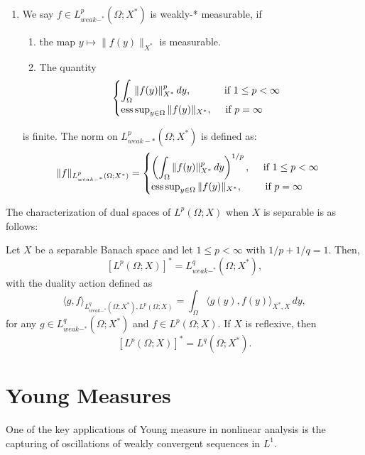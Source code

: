 \begin{defn}
\begin{enumerate}
\begin{enumerate}
        \end{enumerate}
        \item We say $f\in L^p_{weak-^*}(\Omega; X^*)$ is weakly-* measurable, if \begin{enumerate}
            \item the map $y \mapsto \|f(y)\|_{X^*}$ is measurable.
            \item The quantity \begin{equation}
                \begin{cases}
                    \displaystyle \int_{\Omega} \|f(y)\|^p_{X^*} \, dy, \quad \qquad \text{ if } 1 \leq p < \infty \\
                    \operatorname*{ess\,sup}_{y \in \Omega} \|f(y)\|_{X^*}, \quad \text{ if } p = \infty
                \end{cases}
        \end{equation}
        \end{enumerate}
        is finite. The norm on $L^p_{weak-*}(\Omega; X^*)$ is defined as: \begin{equation} \label{eq:norm*}
            \|f\|_{L^p_{weak-^*}(\Omega; X^*)} = \begin{cases}
                                        \left(\displaystyle\int_{\Omega} \|f(y)\|^p_{X^*}\, dy\right)^{1/p}, \quad \text{ if } 1 \leq p < \infty \\
                                        \operatorname*{ess\,sup}_{y \in \Omega} \|f(y)\|_{X^*}, \quad \quad \text{ if } p = \infty
                                    \end{cases}
        \end{equation}
    \end{enumerate}
\end{defn}

The characterization of dual spaces of $L^p(\Omega; X)$ when $X$ is separable is as follows:
\begin{thm}
    Let $X$ be a separable Banach space and let $1 \leq p < \infty$ with $1/p + 1/q = 1$. Then, 
    $$[L^p(\Omega; X)]^* = L^q_{weak-^*}(\Omega; X^*),$$
    with the duality action defined as 
    $$ \langle g,f\rangle_{L^q_{weak-^*}(\Omega;X^*), L^p(\Omega; X)} = \displaystyle \int_\Omega \langle g(y), f(y) \rangle_{X^*, X}\, dy,$$
    for any $g \in L^q_{weak-^*}(\Omega;X^*)$ and $f \in L^p(\Omega; X).$
    If $X$ is reflexive, then
    $$ [L^p(\Omega;X)]^* = L^q(\Omega; X^*).$$
\end{thm}

\section{Young Measures}
One of the key applications of Young measure in nonlinear analysis is the capturing of oscillations of weakly convergent sequences in $L^1$.

